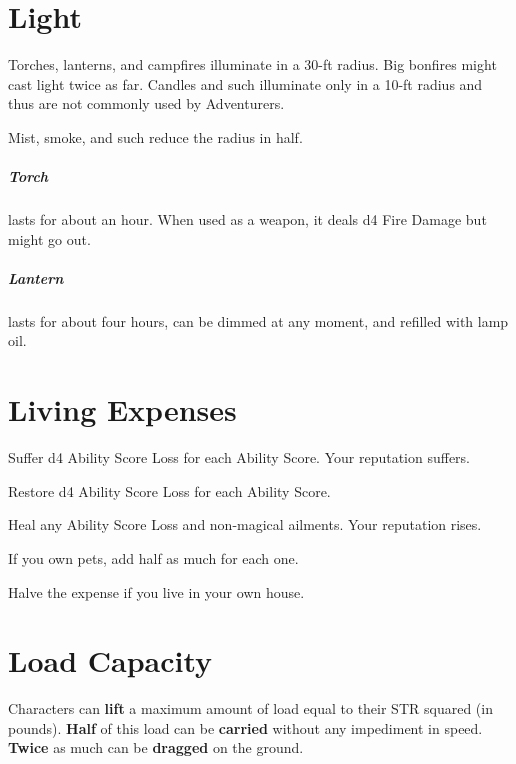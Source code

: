 \documentclass[itdr]{subfiles}
\begin{document}
\vfill

\section{Light}

Torches, lanterns, and campfires illuminate in a \mbox{30-ft} radius. Big bonfires might cast light twice as far. Candles and such illuminate only in a 10-ft radius and thus are not commonly used by Adventurers.

Mist, smoke, and such reduce the radius in half.

\subparagraph{Torch} lasts for about an hour. When used as a weapon, it deals d4 Fire Damage but might go out.

\subparagraph{Lantern} lasts for about four hours, can be dimmed at any moment, and refilled with lamp oil.

\vfill

\section{Living Expenses}

Suffer d4 Ability Score Loss for each Ability Score. Your reputation suffers.

Restore d4 Ability Score Loss for each Ability Score.

Heal any Ability Score Loss and non-magical ailments. Your reputation rises.

If you own pets, add half as much for each one.

Halve the expense if you live in your own house.

\vfill

\section{Load Capacity}

Characters can \textbf{lift} a maximum amount of load equal to their STR squared (in pounds). \textbf{Half} of this load can be \textbf{carried} without any impediment in speed. \textbf{Twice} as much can be \textbf{dragged} on the ground.
\end{document}
